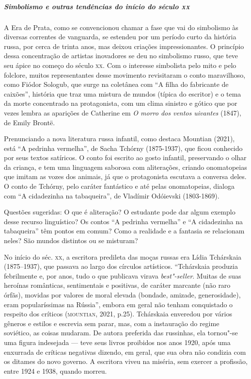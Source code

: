 \documentclass[11pt]{extarticle}
\begin{document}
\subparagraph{Simbolismo e outras tendências do início do século \textsc{xx}}


A Era de Prata, como se convencionou chamar a fase que vai do
simbolismo às diversas correntes de vanguarda, se estendeu por um
período curto da história russa, por cerca de trinta anos, mas deixou
criações impressionantes. O princípio dessa concentração de artistas
inovadores se deu no simbolismo russo, que teve seu ápice no começo do
século \textsc{xx}. Com o interesse simbolista pelo mito e pelo folclore, muitos
representantes desse movimento revisitaram o conto maravilhoso, como
Fiódor Sologub, que surge na coletânea com ``A filha do fabricante de
caixões'', história que traz uma mistura de mundos (típica do
escritor) e o tema da morte concentrado na protagonista, com um clima
sinistro e gótico que por vezes lembra as aparições de Catherine em
\emph{O morro dos ventos uivantes} (1847), de Emily Brontë.

Prenunciando a nova literatura russa infantil, como destaca Mountian
(2021), está ``A pedrinha vermelha'', de Sacha Tchórny (1875-1937), que
ficou conhecido por seus textos satíricos. O conto foi escrito ao gosto
infantil, preservando o olhar da criança, e tem uma linguagem saborosa
com aliterações, criando onomatopeias que imitam as vozes dos animais, já
que o protagonista escutava a conversa deles. O conto de Tchórny, pelo
caráter fantástico e até pelas onomatopeias, dialoga com ``A cidadezinha
na tabaqueira'', de Vladímir Odóievski (1803-1869).




Questões sugeridas: O que é aliteração? O estudante pode dar algum
exemplo desse recurso linguístico? Os contos ``A pedrinha vermelha'' e
``A cidadezinha na tabaqueira'' têm pontos em comum? Como a realidade e
a fantasia se relacionam neles? São mundos distintos ou se misturam?

No início do séc. \textsc{xx}, a escritora predileta das moças russas era Lídia
Tchárskaia (1875--1937), que passava ao largo dos círculos artísticos.
``Tchárskaia produzia febrilmente e, por anos, tudo o que publicava
virava \emph{best"-seller}. Muitas de suas heroínas românticas,
sentimentais e positivas, de caráter marcante (não raro órfãs), movidas
por valores de moral elevada (bondade, amizade, generosidade), eram
popularíssimas na Rússia'', embora em geral não tenham conquistado o
respeito dos críticos (\textsc{mountian}, 2021, p.25). Tchárskaia enveredou por
vários gêneros e estilos e escrevia sem parar, mas, com a instauração do
regime soviético, as coisas mudaram. De autora preferida das russinhas,
ela tornou"-se uma figura indesejada --- teve seus livros proibidos nos
anos 1920, após uma enxurrada de críticas negativas dizendo, em geral,
que sua obra não condizia com os ditames do novo governo. A escritora
viveu na miséria, sem exercer a profissão, entre 1924 e 1938, quando
morreu.
\end{document}
